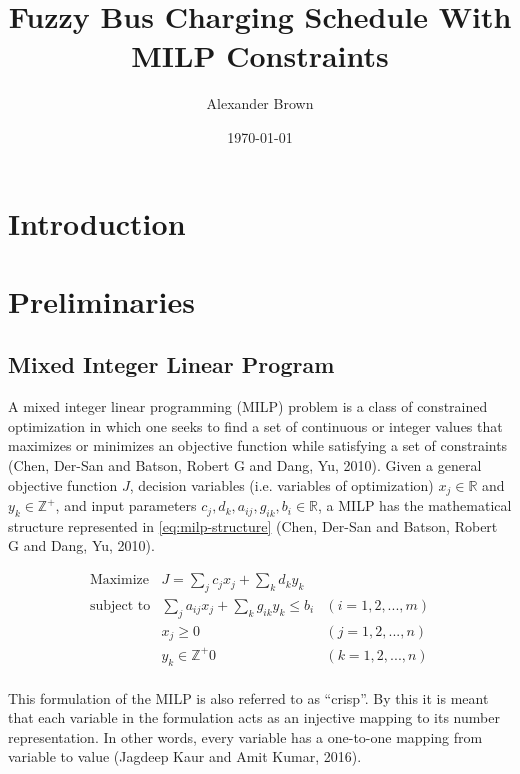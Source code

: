\documentclass[11pt,a4paper,final]{article}
\author{Alexander Brown}
\date{\today}
\title{Fuzzy Bus Charging Schedule With MILP Constraints}
\begin{document}
\maketitle
\tableofcontents

\let\ref\autoref                            %

\section{Introduction}
\label{sec:org0e21b39}
\section{Preliminaries}
\label{sec:org83df3e0}
\subsection{Mixed Integer Linear Program}
\label{sec:org063caa8}
A mixed integer linear programming (MILP) problem is a class of constrained optimization in which one seeks to find a
set of continuous or integer values that maximizes or minimizes an objective function while satisfying a set of
constraints (Chen, Der-San and Batson, Robert G and Dang, Yu, 2010). Given a general objective function \(J\), decision variables (i.e. variables of
optimization) \(x_j \in \mathbb{R}\) and \(y_k \in \mathbb{Z}^+\), and input parameters \(c_j, d_k, a_{ij}, g_{ik}, b_i \in \mathbb{R}\), a MILP has the
mathematical structure represented in \ref{eq:milp-structure} (Chen, Der-San and Batson, Robert G and Dang, Yu, 2010).

\begin{equation}
\label{eq:milp-structure}
\begin{array}{lll}
\text{Maximize}   & J = \sum_j c_j x_j + \sum_k d_k y_k            &                 \\
\text{subject to} & \sum_j a_{ij} x_j + \sum_k g_{ik} y_k  \le b_i & (i = 1,2,...,m) \\
                  & x_j \ge 0                                      & (j = 1,2,...,n) \\
                  & y_k \in \mathbb{Z^+}0                          & (k = 1,2,...,n) \\
\end{array}
\end{equation}

This formulation of the MILP is also referred to as ``crisp''. By this it is meant that each variable in the formulation
acts as an injective mapping to its number representation. In other words, every variable has a one-to-one mapping from
variable to value (Jagdeep Kaur and Amit Kumar, 2016).
\end{document}
